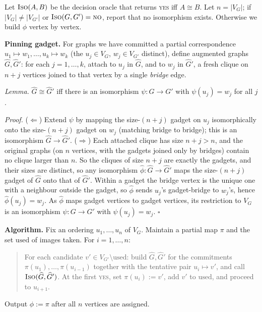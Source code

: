 \documentclass[12pt]{article}
\begin{document}
\begin{solution}
\bbni
Let $\textsc{Iso}(A,B)$ be the decision oracle that returns \textsc{yes} iff $A\cong B$. Let
$n=|V_G|$; if $|V_G|\neq|V_{G'}|$ or $\textsc{Iso}(G,G')=\textsc{no}$, report that no
isomorphism exists. Otherwise we build $\phi$ vertex by vertex.

\textbf{Pinning gadget.} For graphs we have committed a partial correspondence
$u_1\mapsto w_1,\dots,u_k\mapsto w_k$ (the $u_j\in V_G$, $w_j\in V_{G'}$ distinct), define
augmented graphs $\widehat G,\widehat G'$: for each $j=1,\dots,k$, attach to $u_j$ in
$\widehat G$, and to $w_j$ in $\widehat G'$, a fresh clique on $n+j$ vertices joined to that
vertex by a single \emph{bridge} edge.

\emph{Lemma.} $\widehat G\cong\widehat G'$ iff there is an isomorphism $\psi:G\to G'$ with
$\psi(u_j)=w_j$ for all $j$.

\emph{Proof.} ($\Leftarrow$) Extend $\psi$ by mapping the size-$(n+j)$ gadget on $u_j$
isomorphically onto the size-$(n+j)$ gadget on $w_j$ (matching bridge to bridge); this is an
isomorphism $\widehat G\to\widehat G'$.
($\Rightarrow$) Each attached clique has size $n+j>n$, and the original graphs (on $n$
vertices, with the gadgets joined only by bridges) contain no clique larger than $n$. So the
cliques of size $n+j$ are exactly the gadgets, and their sizes are distinct, so any
isomorphism $\widehat\phi:\widehat G\to\widehat G'$ maps the size-$(n+j)$ gadget of
$\widehat G$ onto that of $\widehat G'$. Within a gadget the bridge vertex is the unique one
with a neighbour outside the gadget, so $\widehat\phi$ sends $u_j$'s gadget-bridge to $w_j$'s,
hence $\widehat\phi(u_j)=w_j$. As $\widehat\phi$ maps gadget vertices to gadget vertices, its
restriction to $V_G$ is an isomorphism $\psi:G\to G'$ with $\psi(u_j)=w_j$. \hfill$\square$

\textbf{Algorithm.} Fix an ordering $u_1,\dots,u_n$ of $V_G$. Maintain a partial map $\pi$ and
the set $\mathrm{used}$ of images taken. For $i=1,\dots,n$:
\begin{quote}
For each candidate $v'\in V_{G'}\setminus\mathrm{used}$: build $\widehat G,\widehat G'$ for the
commitments $\pi(u_1),\dots,\pi(u_{i-1})$ together with the tentative pair $u_i\mapsto v'$, and
call $\textsc{Iso}(\widehat G,\widehat G')$. At the first \textsc{yes}, set $\pi(u_i):=v'$, add
$v'$ to $\mathrm{used}$, and proceed to $u_{i+1}$.
\end{quote}
Output $\phi:=\pi$ after all $n$ vertices are assigned.


\end{solution}
\end{document}
